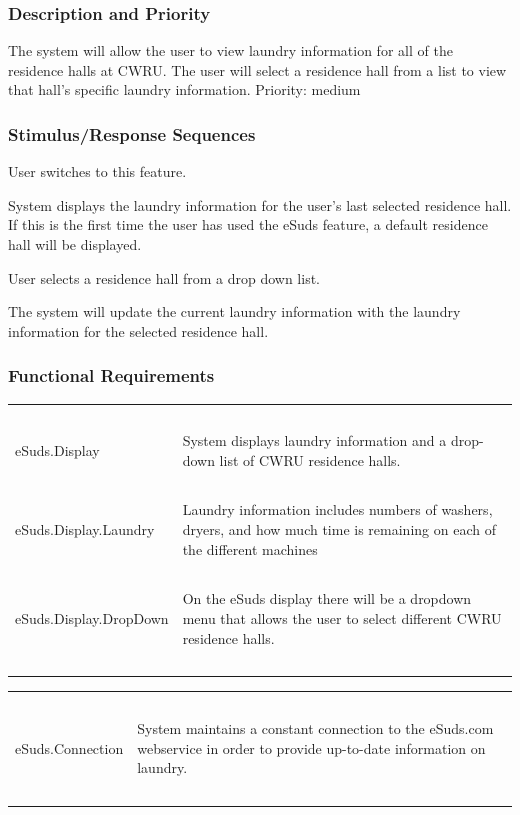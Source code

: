 \documentclass[pdftex,12pt,letter]{article}
\begin{document}
\subsubsection{Description and Priority}
The system will allow the user to view laundry information for all of the residence halls at CWRU. The user will select a residence hall from a list to view that hall's specific laundry information. Priority: medium
\subsubsection{Stimulus/Response Sequences}
\begin{description}\itemsep1pt
\item[Stimulus:] User switches to this feature.
\item[Response:] System displays the laundry information for the user's last selected residence hall. If this is the first time the user has used the eSuds feature, a default residence hall will be displayed.
\item[Stimulus:] User selects a residence hall from a drop down list.
\item[Response:] The system will update the current laundry information with the laundry information for the selected residence hall.
\end{description}
\subsubsection{Functional Requirements}
\begin{table}[!h]
\begin{tabularx}{\textwidth}[t]{|l Y|}
\hline
~&~\\
eSuds.Display & System displays laundry information and a drop-down list of CWRU residence halls.\\ 
~&~\\
eSuds.Display.Laundry & Laundry information includes numbers of washers, dryers, and how much time is remaining on each of the different machines \\
~&~\\
eSuds.Display.DropDown & On the eSuds display there will be a dropdown menu that allows the user to select different CWRU residence halls.\\
~&~\\
\hline
\end{tabularx}
\end{table}
\begin{table}[!h]
\begin{tabularx}{\textwidth}[t]{|l Y|}
\hline
~&~\\
eSuds.Connection & System maintains a constant connection to the eSuds.com webservice in order to provide up-to-date information on laundry.\\
~&~\\
\hline
\end{tabularx}
\end{table}
\FloatBarrier
\end{document}
